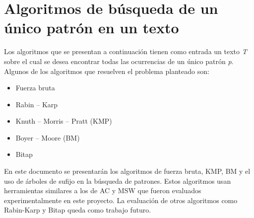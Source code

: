 \section{Algoritmos de búsqueda de un único patrón en un texto}
\label{sec:unpatron}
Los algoritmos que se presentan a continuación tienen como entrada un texto {\it T} sobre el cual se desea encontrar todas las ocurrencias de un único patrón {\it p}.\\
Algunos de los algoritmos que resuelven el problema planteado son: 
\begin{itemize}
\item Fuerza bruta
\item Rabin – Karp 
\item Knuth – Morris – Pratt (KMP) 
\item Boyer – Moore (BM)
\item Bitap 
\end{itemize}
En este documento se presentarán los algoritmos de fuerza bruta, KMP, BM y el uso de árboles de sufijo en la búsqueda de patrones. Estos algoritmos usan herramientas similares a los de AC y MSW que fueron evaluados experimentalmente en este proyecto. La evaluación de otros algoritmos como Rabin-Karp \cite{KARP} y Bitap \cite{BAEZA} queda como trabajo futuro.
